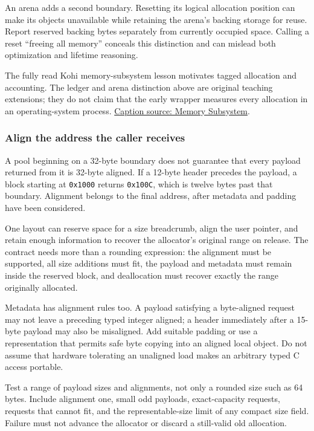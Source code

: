 An arena adds a second boundary. Resetting its logical allocation position can make its objects unavailable while retaining the arena's backing storage for reuse. Report reserved backing bytes separately from currently occupied space. Calling a reset ``freeing all memory'' conceals this distinction and can mislead both optimization and lifetime reasoning.

The fully read Kohi memory-subsystem lesson motivates tagged allocation and accounting. The ledger and arena distinction above are original teaching extensions; they do not claim that the early wrapper measures every allocation in an operating-system process. \href{https://www.youtube.com/watch?v=_GBUCo2FbUk}{Caption source: Memory Subsystem}.

\subsubsection{Align the address the caller receives}\label{05-engine-i-ch014-align-the-address-the-caller-receives}

\hypertarget{05-engine-i-ch014-align-the-address-the-caller-receives}{}

A pool beginning on a 32-byte boundary does not guarantee that every payload returned from it is 32-byte aligned. If a 12-byte header precedes the payload, a block starting at \texttt{0x1000} returns \texttt{0x100C}, which is twelve bytes past that boundary. Alignment belongs to the final address, after metadata and padding have been considered.

One layout can reserve space for a size breadcrumb, align the user pointer, and retain enough information to recover the allocator's original range on release. The contract needs more than a rounding expression: the alignment must be supported, all size additions must fit, the payload and metadata must remain inside the reserved block, and deallocation must recover exactly the range originally allocated.

Metadata has alignment rules too. A payload satisfying a byte-aligned request may not leave a preceding typed integer aligned; a header immediately after a 15-byte payload may also be misaligned. Add suitable padding or use a representation that permits safe byte copying into an aligned local object. Do not assume that hardware tolerating an unaligned load makes an arbitrary typed C access portable.

Test a range of payload sizes and alignments, not only a rounded size such as 64 bytes. Include alignment one, small odd payloads, exact-capacity requests, requests that cannot fit, and the representable-size limit of any compact size field. Failure must not advance the allocator or discard a still-valid old allocation.

